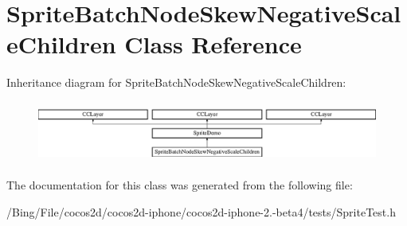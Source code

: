 \hypertarget{interface_sprite_batch_node_skew_negative_scale_children}{\section{Sprite\-Batch\-Node\-Skew\-Negative\-Scale\-Children Class Reference}
\label{interface_sprite_batch_node_skew_negative_scale_children}
}
Inheritance diagram for Sprite\-Batch\-Node\-Skew\-Negative\-Scale\-Children\-:\begin{figure}[H]
\begin{center}
\leavevmode
\includegraphics[height=2.036364cm]{interface_sprite_batch_node_skew_negative_scale_children}
\end{center}
\end{figure}


The documentation for this class was generated from the following file\-:\begin{DoxyCompactItemize}
\item 
/\-Bing/\-File/cocos2d/cocos2d-\/iphone/cocos2d-\/iphone-\/2.-\/beta4/tests/Sprite\-Test.\-h\end{DoxyCompactItemize}
